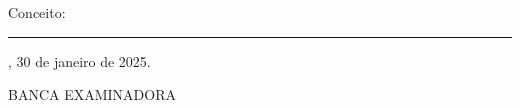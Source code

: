 \documentclass[
	12pt,				%
	openright,			%
	oneside,			%
	a4paper,			%
	english,			%
	brazil				%
	]{abntex2}
\begin{document}



%
% 
%
\begin{folhadeaprovacao}

  \begin{center}
    {\ABNTEXchapterfont\large\imprimirautor}

    \vspace*{\fill}\vspace*{\fill}
    \begin{center}
      \ABNTEXchapterfont\bfseries\Large\imprimirtitulo
    \end{center}
    \vspace*{\fill}
    
    \hspace{.45\textwidth}
    \begin{minipage}{.5\textwidth}
        \imprimirpreambulo
    \end{minipage}%
    \vspace*{\fill}
   \end{center}
        
   Conceito: \rule{3cm}{.1pt}
   
   \imprimirlocal, 30 de janeiro de 2025.
   
   \vspace{1cm}
   \begin{center}
   BANCA EXAMINADORA
   \end{center}
    


      

  
\end{folhadeaprovacao}
\end{document}
